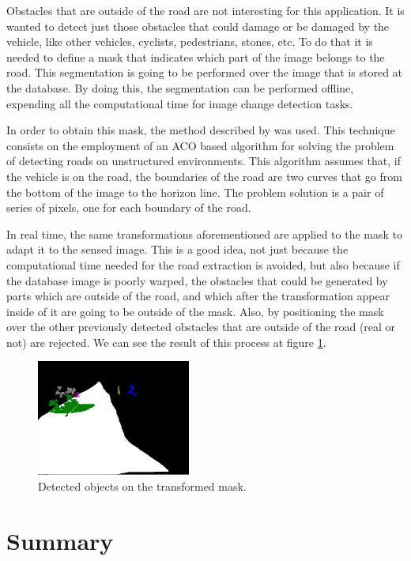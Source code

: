 Obstacles that are outside of the road are not interesting for this application. It is wanted to detect just those obstacles that could damage or be damaged by the vehicle, like other vehicles, cyclists, pedestrians, stones, etc. To do that it is needed to define a mask that indicates which part of the image belongs to the road. This segmentation is going to be performed over the image that is stored at the database. By doing this, the segmentation can be performed offline, expending all the computational time for image change detection tasks.

In order to obtain this mask, the method described by \cite{arnay2009applying} was used. This technique consists on the employment of an \ac{ACO} based algorithm for solving the problem of detecting roads on unstructured environments. This algorithm assumes that, if the vehicle is on the road, the boundaries of the road are two curves that go from the bottom of the image to the horizon line. The problem solution is a pair of series of pixels, one for each boundary of the road.

In real time, the same transformations aforementioned are applied to the mask to adapt it to the sensed image. This is a good idea, not just because the computational time needed for the road extraction is avoided, but also because if the database image is poorly warped, the obstacles that could be generated by parts which are outside of the road, and which after the transformation appear inside of it are going to be outside of the mask. Also, by positioning the mask over the other previously detected obstacles that are outside of the road (real or not) are rejected. We can see the result of this process at figure \ref{fig:cp01_mask_warped}.

\begin{figure}[h!]
\centering
\includegraphics[width=0.45\textwidth]{maskWarped}
\caption{Detected objects on the transformed mask.}\label{fig:cp01_mask_warped}
\end{figure}

\section{Summary}\label{ch:chapter01_03}


